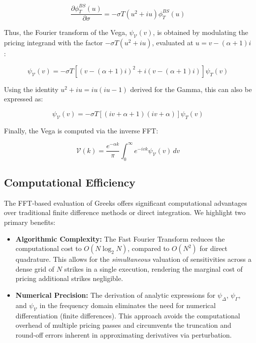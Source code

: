 \documentclass{article}
\begin{document}
\begin{equation}
    \frac{\partial \phi_T^{BS}(u)}{\partial \sigma} = -\sigma T (u^2 + iu) \phi_T^{BS}(u)
\end{equation}

Thus, the Fourier transform of the Vega, $\psi_{\mathcal{V}}(v)$, is obtained by modulating the pricing integrand with the factor $-\sigma T (u^2 + iu)$, evaluated at $u = v - (\alpha+1)i$:

\begin{equation}
    \psi_{\mathcal{V}}(v) = -\sigma T \left[ (v - (\alpha+1)i)^2 + i(v - (\alpha+1)i) \right] \psi_T(v)
\end{equation}

Using the identity $u^2 + iu = iu(iu-1)$ derived for the Gamma, this can also be expressed as:

\begin{equation}
    \psi_{\mathcal{V}}(v) = -\sigma T \left[ (iv + \alpha + 1)(iv + \alpha) \right] \psi_T(v)
\end{equation}

Finally, the Vega is computed via the inverse FFT:

\begin{equation}
    \mathcal{V}(k) = \frac{e^{-\alpha k}}{\pi} \int_{0}^{\infty} e^{-ivk} \psi_{\mathcal{V}}(v) \, dv
\end{equation}


\subsection{Computational Efficiency}

The FFT-based evaluation of Greeks offers significant computational advantages over traditional finite difference methods or direct integration. We highlight two primary benefits:

\begin{itemize}
    \item \textbf{Algorithmic Complexity:} The Fast Fourier Transform reduces the computational cost to $O(N \log_2 N)$, compared to $O(N^2)$ for direct quadrature. This allows for the \textit{simultaneous} valuation of sensitivities across a dense grid of $N$ strikes in a single execution, rendering the marginal cost of pricing additional strikes negligible.

    \item \textbf{Numerical Precision:} The derivation of analytic expressions for $\psi_{\Delta}$, $\psi_{\Gamma}$, and $\psi_{\mathcal{V}}$ in the frequency domain eliminates the need for numerical differentiation (finite differences). This approach avoids the computational overhead of multiple pricing passes and circumvents the truncation and round-off errors inherent in approximating derivatives via perturbation.
\end{itemize}
\end{document}
